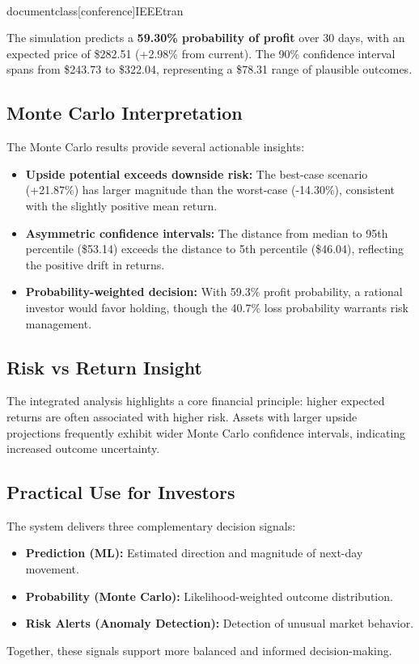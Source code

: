 \\documentclass[conference]{IEEEtran}
\begin{document}
The simulation predicts a \textbf{59.30\% probability of profit} over 30 days, with an expected price of \$282.51 (+2.98\% from current). The 90\% confidence interval spans from \$243.73 to \$322.04, representing a \$78.31 range of plausible outcomes.

\subsection{Monte Carlo Interpretation}

The Monte Carlo results provide several actionable insights:

\begin{itemize}
    \item \textbf{Upside potential exceeds downside risk:} The best-case scenario (+21.87\%) has larger magnitude than the worst-case (-14.30\%), consistent with the slightly positive mean return.
    \item \textbf{Asymmetric confidence intervals:} The distance from median to 95th percentile (\$53.14) exceeds the distance to 5th percentile (\$46.04), reflecting the positive drift in returns.
    \item \textbf{Probability-weighted decision:} With 59.3\% profit probability, a rational investor would favor holding, though the 40.7\% loss probability warrants risk management.
\end{itemize}

\subsection{Risk vs Return Insight}
The integrated analysis highlights a core financial principle: higher expected returns are often associated with higher risk. Assets with larger upside projections frequently exhibit wider Monte Carlo confidence intervals, indicating increased outcome uncertainty.

\subsection{Practical Use for Investors}
The system delivers three complementary decision signals:
\begin{itemize}
    \item \textbf{Prediction (ML):} Estimated direction and magnitude of next-day movement.
    \item \textbf{Probability (Monte Carlo):} Likelihood-weighted outcome distribution.
    \item \textbf{Risk Alerts (Anomaly Detection):} Detection of unusual market behavior.
\end{itemize}
Together, these signals support more balanced and informed decision-making.
\end{document}
